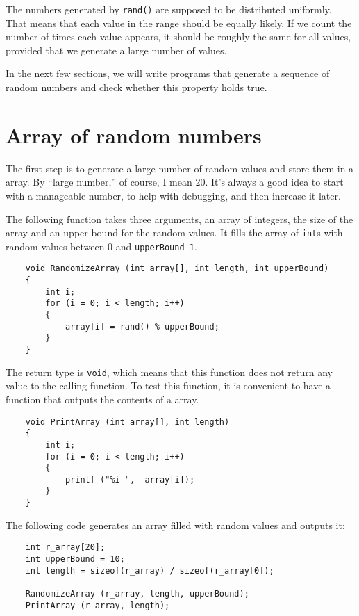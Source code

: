 The numbers generated by {\tt rand()} are supposed to be distributed
uniformly.  That means that each value in the range should be
equally likely.  If we count the number of times each value appears,
it should be roughly the same for all values, provided that we
generate a large number of values.

In the next few sections, we will write programs that generate
a sequence of random numbers and check whether this property
holds true.

\section{Array of random numbers}
\label{Array of random numbers}

The first step is to generate a large number of random values
and store them in a array.  By ``large number,'' of course,
I mean 20.  It's always a good idea to start with a manageable
number, to help with debugging, and then increase it later.

The following function takes three arguments, an array of integers, 
the size of the array and an upper bound for the random values.  
It fills the array of {\tt int}s with random values between 0 and {\tt upperBound-1}.

\begin{verbatim}
    void RandomizeArray (int array[], int length, int upperBound) 
    {
        int i;
        for (i = 0; i < length; i++) 
        {
            array[i] = rand() % upperBound;
        }
    }
\end{verbatim}
%
The return type is {\tt void}, which means that
this function does not return any value to the calling function.
To test this function, it is convenient to have a function that
outputs the contents of a array.

\begin{verbatim}
    void PrintArray (int array[], int length) 
    {
        int i;
        for (i = 0; i < length; i++) 
        {
            printf ("%i ",  array[i]);
        }
    }
\end{verbatim}
%
The following code generates an array filled with random values and outputs it:

\begin{verbatim}
    int r_array[20];
    int upperBound = 10;
    int length = sizeof(r_array) / sizeof(r_array[0]);
  
    RandomizeArray (r_array, length, upperBound);
    PrintArray (r_array, length);
\end{verbatim}

